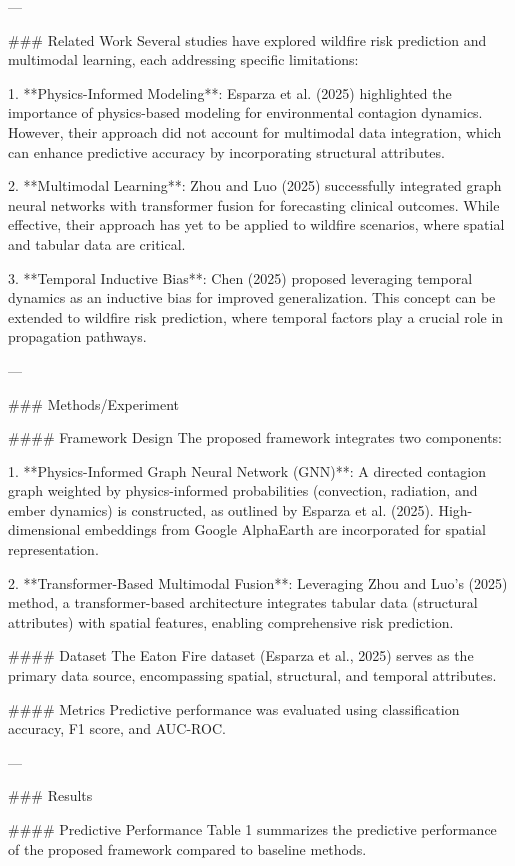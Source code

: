 ---

### Related Work  
Several studies have explored wildfire risk prediction and multimodal learning, each addressing specific limitations:  

1. **Physics-Informed Modeling**: Esparza et al. (2025) highlighted the importance of physics-based modeling for environmental contagion dynamics. However, their approach did not account for multimodal data integration, which can enhance predictive accuracy by incorporating structural attributes.  

2. **Multimodal Learning**: Zhou and Luo (2025) successfully integrated graph neural networks with transformer fusion for forecasting clinical outcomes. While effective, their approach has yet to be applied to wildfire scenarios, where spatial and tabular data are critical.  

3. **Temporal Inductive Bias**: Chen (2025) proposed leveraging temporal dynamics as an inductive bias for improved generalization. This concept can be extended to wildfire risk prediction, where temporal factors play a crucial role in propagation pathways.  

---

### Methods/Experiment  

#### Framework Design  
The proposed framework integrates two components:  

1. **Physics-Informed Graph Neural Network (GNN)**: A directed contagion graph weighted by physics-informed probabilities (convection, radiation, and ember dynamics) is constructed, as outlined by Esparza et al. (2025). High-dimensional embeddings from Google AlphaEarth are incorporated for spatial representation.  

2. **Transformer-Based Multimodal Fusion**: Leveraging Zhou and Luo's (2025) method, a transformer-based architecture integrates tabular data (structural attributes) with spatial features, enabling comprehensive risk prediction.  

#### Dataset  
The Eaton Fire dataset (Esparza et al., 2025) serves as the primary data source, encompassing spatial, structural, and temporal attributes.  

#### Metrics  
Predictive performance was evaluated using classification accuracy, F1 score, and AUC-ROC.  

---

### Results  

#### Predictive Performance  
Table 1 summarizes the predictive performance of the proposed framework compared to baseline methods.  

